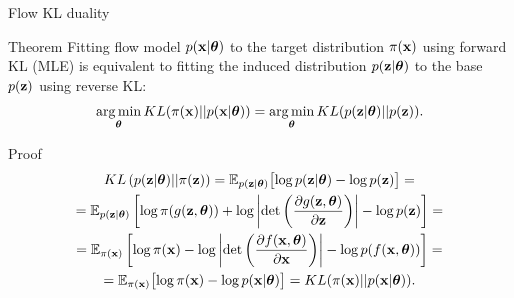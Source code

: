\begin{frame}{Flow KL duality}
	\begin{block}{Theorem}
		Fitting flow model $p(\mathbf{x}| \boldsymbol{\theta})$ to the target distribution $\pi(\mathbf{x})$ using forward KL (MLE) is equivalent to fitting the induced distribution $p(\mathbf{z}| \boldsymbol{\theta})$ to the base $p(\mathbf{z})$ using reverse KL:
		\[
			\operatorname*{arg\,min}_{\boldsymbol{\theta}} KL(\pi(\mathbf{x}) || p(\mathbf{x} | \boldsymbol{\theta})) = \operatorname*{arg\,min}_{\boldsymbol{\theta}} KL(p(\mathbf{z} | \boldsymbol{\theta}) || p(\mathbf{z})).
		\]
		\vspace{-0.7cm}
	\end{block}
	\begin{block}{Proof}
		\vspace{-0.7cm}
		\begin{multline*}
			KL\left(p(\mathbf{z} | \boldsymbol{\theta}) || \pi(\mathbf{z}) \right) = \mathbb{E}_{p(\mathbf{z} | \boldsymbol{\theta})} \bigl[ \log p(\mathbf{z} | \boldsymbol{\theta}) - \log p(\mathbf{z}) \bigr] = \\ 
			= \mathbb{E}_{p(\mathbf{z} | \boldsymbol{\theta})} \left[ \log \pi(g(\mathbf{z}, \boldsymbol{\theta})) + \log \left| \det \left( \frac{\partial g(\mathbf{z}, \boldsymbol{\theta})}{\partial \mathbf{z}}\right) \right| - \log p(\mathbf{z}) \right] = \\
			= \mathbb{E}_{\pi(\mathbf{x})} \left[ \log \pi(\mathbf{x}) - \log \left| \det \left( \frac{\partial f(\mathbf{x}, \boldsymbol{\theta})}{\partial \mathbf{x}}\right) \right| - \log p(f(\mathbf{x}, \boldsymbol{\theta})) \right] = \\
			= \mathbb{E}_{\pi(\mathbf{x})} \bigl[ \log \pi(\mathbf{x}) - \log p(\mathbf{x} | \boldsymbol{\theta}) \bigr] = KL (\pi(\mathbf{x}) || p(\mathbf{x} | \boldsymbol{\theta})).
		\end{multline*}
	\end{block}
\end{frame}
